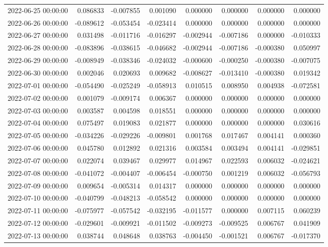 \begin{tabular}{lrrrrrrr}
2022-06-25 00:00:00 & 0.086833 & -0.007855 & 0.001090 & 0.000000 & 0.000000 & 0.000000 & 0.000000 \\
2022-06-26 00:00:00 & -0.089612 & -0.053454 & -0.023414 & 0.000000 & 0.000000 & 0.000000 & 0.000000 \\
2022-06-27 00:00:00 & 0.031498 & -0.011716 & -0.016297 & -0.002944 & -0.007186 & 0.000000 & -0.010333 \\
2022-06-28 00:00:00 & -0.083896 & -0.038615 & -0.046682 & -0.002944 & -0.007186 & -0.000380 & 0.050997 \\
2022-06-29 00:00:00 & -0.008949 & -0.038346 & -0.024032 & -0.000600 & -0.000250 & -0.000380 & -0.007075 \\
2022-06-30 00:00:00 & 0.002046 & 0.020693 & 0.009682 & -0.008627 & -0.013410 & -0.000380 & 0.019342 \\
2022-07-01 00:00:00 & -0.054490 & -0.025249 & -0.058913 & 0.010515 & 0.008950 & 0.004938 & -0.072581 \\
2022-07-02 00:00:00 & 0.001079 & -0.009174 & 0.006367 & 0.000000 & 0.000000 & 0.000000 & 0.000000 \\
2022-07-03 00:00:00 & 0.003587 & 0.004598 & 0.018551 & 0.000000 & 0.000000 & 0.000000 & 0.000000 \\
2022-07-04 00:00:00 & 0.075497 & 0.019083 & 0.021877 & 0.000000 & 0.000000 & 0.000000 & 0.030616 \\
2022-07-05 00:00:00 & -0.034226 & -0.029226 & -0.009801 & 0.001768 & 0.017467 & 0.004141 & 0.000360 \\
2022-07-06 00:00:00 & 0.045780 & 0.012892 & 0.021316 & 0.003584 & 0.003494 & 0.004141 & -0.029851 \\
2022-07-07 00:00:00 & 0.022074 & 0.039467 & 0.029977 & 0.014967 & 0.022593 & 0.006032 & -0.024621 \\
2022-07-08 00:00:00 & -0.041072 & -0.004407 & -0.006454 & -0.000750 & 0.001219 & 0.006032 & -0.056793 \\
2022-07-09 00:00:00 & 0.009654 & -0.005314 & 0.014317 & 0.000000 & 0.000000 & 0.000000 & 0.000000 \\
2022-07-10 00:00:00 & -0.040799 & -0.048213 & -0.058542 & 0.000000 & 0.000000 & 0.000000 & 0.000000 \\
2022-07-11 00:00:00 & -0.075977 & -0.057542 & -0.032195 & -0.011577 & 0.000000 & 0.007115 & 0.060239 \\
2022-07-12 00:00:00 & -0.029601 & -0.009921 & -0.011502 & -0.009273 & -0.009525 & 0.006767 & 0.041909 \\
2022-07-13 00:00:00 & 0.038744 & 0.048648 & 0.038763 & -0.004450 & -0.001521 & 0.006767 & -0.017370 \\

\end{tabular}
